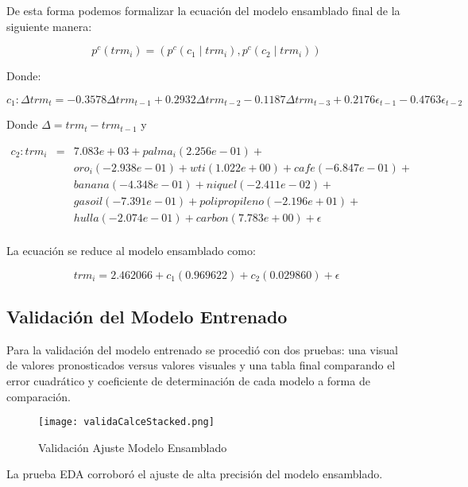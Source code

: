 De esta forma podemos formalizar la ecuación del modelo ensamblado final de la siguiente manera:

\begin{equation}
    p^{c}(trm_i) = (p^{c}(c_{1} \mid trm_i),p^{c}(c_{2} \mid trm_i))
\end{equation}

Donde:

\begin{equation}
    c_{1} : \Delta trm_t = -0.3578 \Delta trm_{t-1} + 0.2932 \Delta trm_{t-2} - 0.1187 \Delta trm_{t-3} + 0.2176 \epsilon_{t-1} - 0.4763 \epsilon_{t-2}
\end{equation}

Donde $\Delta = trm_{t} - trm_{t-1}$ y

\begin{eqnarray*}
    c_2 : trm_i & = & 7.083e+03 + palma_i(2.256e-01) + \\
& & oro_i(-2.938e-01) + wti(1.022e+00) + cafe(-6.847e-01) +  \\
& & banana(-4.348e-01) + niquel(-2.411e-02) + \\ 
& & gasoil(-7.391e-01) + polipropileno(-2.196e+01) + \\
& & hulla(-2.074e-01) + carbon(7.783e+00) + \epsilon \\
\end{eqnarray*}

La ecuación se reduce al modelo ensamblado como:

\begin{equation}
    trm_i = 2.462066 + c_1(0.969622) + c_2(0.029860) + \epsilon
\end{equation}
  
\subsection{Validación del Modelo Entrenado}
Para la validación del modelo entrenado se procedió con dos pruebas: una visual de valores pronosticados versus valores visuales y una tabla final comparando el error cuadrático y coeficiente de determinación de cada modelo a forma de comparación. 

\begin{figure}[h!]
    \centering
    \texttt{[image: validaCalceStacked.png]}
    \caption{Validación Ajuste Modelo Ensamblado}
\end{figure}   

La prueba EDA corroboró el ajuste de alta precisión del modelo ensamblado. 

